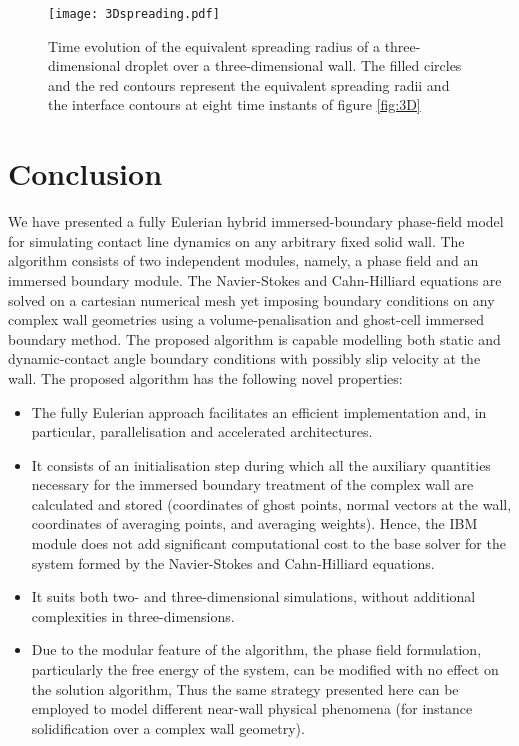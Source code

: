 \documentclass[review]{elsarticle}
\begin{document}
\begin{figure} [H] 
\centering
\texttt{[image: 3Dspreading.pdf]}

\caption{Time evolution of the equivalent spreading radius of a three-dimensional droplet over a three-dimensional wall. The filled circles and the red contours represent the equivalent spreading radii and the interface contours at eight time instants of figure  \ref{fig:3D}}
\label{fig:3Dspreading}
\end{figure}


\section{Conclusion} \label{sec:conclusion}
We have presented a fully Eulerian hybrid immersed-boundary phase-field model for simulating contact line dynamics on any arbitrary fixed solid wall. The algorithm consists of two independent modules, namely, a phase field and an immersed boundary module. The Navier-Stokes and Cahn-Hilliard equations are solved on a cartesian numerical mesh yet imposing  boundary conditions on any complex wall geometries
 using a volume-penalisation and ghost-cell immersed boundary method. The proposed algorithm is capable modelling both static and dynamic-contact angle boundary conditions with possibly slip velocity at the wall. The proposed algorithm has the following novel properties:
\begin{itemize}
\item The fully Eulerian approach facilitates an efficient implementation and, in particular, parallelisation and accelerated architectures.
\item It consists of an initialisation step during which all the  auxiliary quantities necessary for the immersed boundary treatment of the complex wall are calculated and stored (coordinates of ghost points, normal vectors at the wall, coordinates of averaging points, and averaging weights).  Hence, the IBM module does not add significant computational cost to the base solver for the system formed by the Navier-Stokes and Cahn-Hilliard equations.
\item It suits both two- and three-dimensional simulations, without additional complexities in three-dimensions.
\item Due to the modular feature of the algorithm, the phase field formulation, particularly the free energy of the system, can be modified with no effect on the solution algorithm, Thus the same strategy presented here can be employed to model different near-wall physical phenomena (for instance solidification over a complex wall geometry).
\end{itemize}
\end{document}
